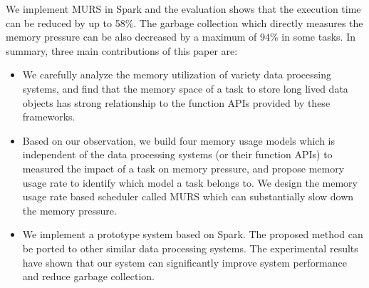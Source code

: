 

We implement MURS in Spark and the evaluation shows that the execution time can be reduced by up to 58\%. The garbage collection which directly measures the memory pressure can be also decreased by a maximum of 94\% in some tasks. In summary, three main contributions of this paper are:

\begin{itemize}

\item We carefully analyze the memory utilization of variety data processing systems, and find that the memory space of a task to store long lived data objects has strong relationship to the function APIs provided by these frameworks.


\item Based on our observation, we build four memory usage models which is independent of the data processing systems (or their function APIs) to measured the impact of a task on memory pressure, and propose memory usage rate to identify which model a task belongs to. We design the memory usage rate based scheduler called MURS which can substantially slow down the memory pressure.


\item We implement a prototype system based on Spark. The proposed method can be ported to other similar data processing systems. The experimental results have shown that our system can significantly improve system performance and reduce garbage collection.

\end{itemize}


